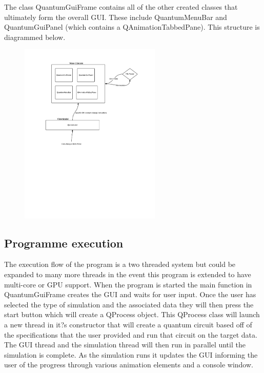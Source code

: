 \documentclass[bibliography=totocnumbered, 10pt]{article}
\theoremstyle{NoticeStyle}
\begin{document}
The class QuantumGuiFrame contains all of the other created classes that ultimately form the overall GUI. These include QuantumMenuBar and QuantumGuiPanel (which contains a QAnimationTabbedPane). This structure is diagrammed below.

\begin{figure}[H]
\centering
\includegraphics[width=0.6\textwidth]{img/GuiOverall.pdf}
\caption{}
\end{figure}

\subsection{Programme execution}
The execution flow of the program is a two threaded system but could be expanded to many more threads in the event this program is extended to have multi-core or GPU support. When the program is started the main function in QuantumGuiFrame creates the GUI and waits for user input.  Once the user has selected the type of simulation and the associated data they will then press the start button which will create a QProcess object.  This QProcess class will launch a new thread in it?s constructor that will create a quantum circuit based off of the specifications that the user provided and run that circuit on the target data. The GUI thread and the simulation thread will then run in parallel until the simulation is complete. As the simulation runs it updates the GUI informing the user of the progress through various animation elements and a console window.
\end{document}
